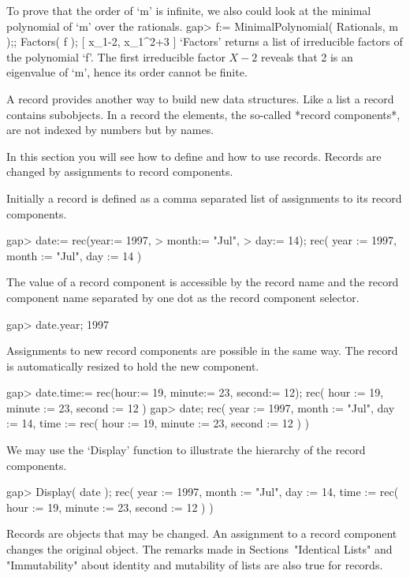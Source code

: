 To prove that the order of `m' is infinite, we also could look at the
minimal polynomial of `m' over the rationals.
\beginexample
gap> f:= MinimalPolynomial( Rationals, m );;  Factors( f );
[ x_1-2, x_1^2+3 ]
\endexample
`Factors'  returns a list of  irreducible factors  of the polynomial `f'.
The first  irreducible factor $X-2$ reveals   that 2 is an  eigenvalue of
`m', hence its order cannot be finite.



A record provides another way to  build new data structures.  Like a list
a record contains subobjects.
In a record the elements, the so-called *record components*,
are not indexed by numbers but by names.

In this section you will see how to define and how to use records.
Records are changed by assignments to record components.

Initially a record is defined as a comma separated list of assignments to
its record components.

\beginexample
gap> date:= rec(year:= 1997,
>               month:= "Jul",
>               day:= 14);
rec( year := 1997, month := "Jul", day := 14 )
\endexample

The value of a record component is accessible by  the record name and the
record  component name separated   by one dot   as  the record  component
selector.

\beginexample
gap> date.year;
1997
\endexample

Assignments to new record components  are possible in  the same way.  The
record is automatically resized to hold the new component.

\beginexample
gap> date.time:= rec(hour:= 19, minute:= 23, second:= 12);
rec( hour := 19, minute := 23, second := 12 )
gap> date;
rec( year := 1997, month := "Jul", day := 14, 
  time := rec( hour := 19, minute := 23, second := 12 ) )
\endexample

We may use the `Display' function to illustrate the hierarchy of the record
components.

\beginexample
gap> Display( date );
rec(
  year := 1997,
  month := "Jul",
  day := 14,
  time := rec(
      hour := 19,
      minute := 23,
      second := 12 ) )
\endexample

Records are objects  that  may be  changed.   An assignment to  a  record
component  changes the original  object.
The remarks made in Sections~"Identical Lists" and "Immutability"
about identity and mutability of lists are also true for records.

